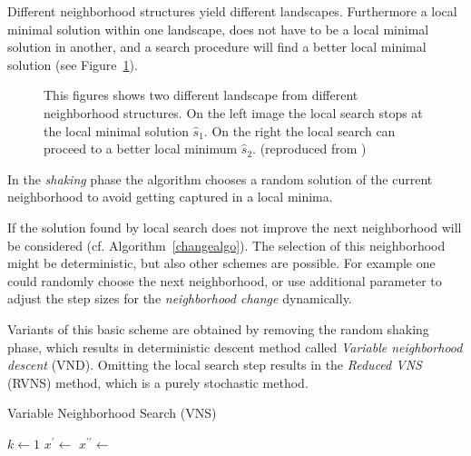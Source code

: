 Different neighborhood structures yield different landscapes. 
Furthermore a local minimal solution within one landscape, does not have to be a local minimal solution in another, and a search procedure will find a better local minimal solution (see Figure~\ref{fig:fig_vns}). 

\begin{figure}[thb]
   \footnotesize
   \centering
   \myfloatalign
   \captionsetup[subfigure]{labelformat=empty} 
    \caption[Search landscapes of two different neighborhoods.]{This figures shows two different landscape from different neighborhood structures. On the left image the local search stops at the local minimal solution $\hat{s}_1$. On the right the local search can proceed to a better local minimum $\hat{s}_2$. (reproduced from \cite{blum2003metaheuristics})}  
     \label{fig:fig_vns}
\end{figure}

In the \emph{shaking} phase the algorithm chooses a random solution of the current neighborhood to avoid getting captured in a local minima.  

If the solution found by local search does not improve the next neighborhood will be considered (cf. Algorithm~\ref{changealgo}). 
The selection of this neighborhood might be deterministic, but also other schemes are possible. For example one could randomly choose the next neighborhood, or use additional parameter to adjust the step sizes for the \emph{neighborhood change} dynamically.

Variants of this basic scheme are obtained by removing the random shaking phase, which results in deterministic descent method called \emph{Variable neighborhood descent} (VND). Omitting the local search step results in the \emph{Reduced VNS} (RVNS) method, which is a purely stochastic method.

\begin{algorithm}
\caption{Variable Neighborhood Search (VNS)}
\label{vnsalgo}
\begin{algorithmic}[1]
\Repeat
\State $k \gets 1$
\Repeat
\State $x^{\prime} \gets$ 
\State $x^{\prime \prime}\gets$ 
\State {}
\EndFunction
\end{algorithmic}
\end{algorithm}

